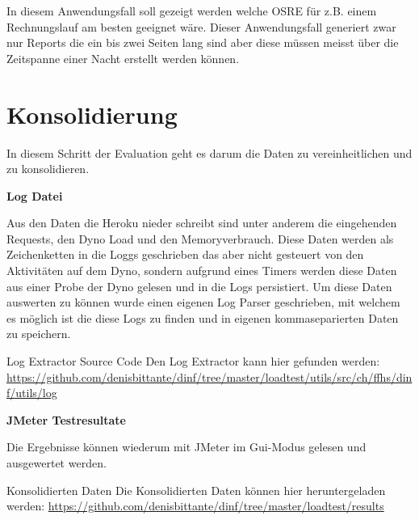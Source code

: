 \documentclass[main.tex]{subfiles}
\begin{document}
In diesem Anwendungsfall soll gezeigt werden welche  OSRE für z.B. einem Rechnungslauf am besten geeignet wäre. Dieser Anwendungsfall generiert zwar nur Reports die ein bis zwei Seiten lang sind aber diese müssen meisst über die Zeitspanne einer Nacht erstellt werden können. 



\section{Konsolidierung}
In diesem Schritt der Evaluation geht es darum die Daten zu vereinheitlichen und zu konsolidieren.

\textbf{Log Datei}

Aus den Daten die Heroku nieder schreibt sind unter anderem die eingehenden Requests, den Dyno Load und den Memoryverbrauch. Diese Daten werden als Zeichenketten in die Loggs geschrieben das aber nicht gesteuert von den Aktivitäten auf dem Dyno, sondern aufgrund eines Timers werden diese Daten aus einer Probe der Dyno gelesen und in die Logs persistiert. Um diese Daten auswerten zu können wurde einen eigenen Log Parser geschrieben, mit welchem es möglich ist die diese Logs zu finden und in eigenen kommaseparierten Daten zu speichern.   

\begin{reference}{Log Extractor Source Code}
Den Log Extractor kann hier gefunden werden:  \url{https://github.com/denisbittante/dinf/tree/master/loadtest/utils/src/ch/ffhs/dinf/utils/log}
 
\end{reference}



\textbf{JMeter Testresultate}


Die Ergebnisse können wiederum mit JMeter im Gui-Modus gelesen und ausgewertet werden. 



\begin{reference}{Konsolidierten Daten}
Die Konsolidierten Daten können hier heruntergeladen werden:  \url{https://github.com/denisbittante/dinf/tree/master/loadtest/results}
 
\end{reference}
\end{document}
